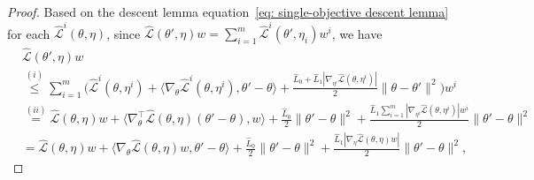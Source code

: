 \documentclass[twoside]{article} %
\def\eqref#1{equation~\ref{#1}}
\theoremstyle{plain}
\theoremstyle{definition}
\theoremstyle{remark}
\newcommand{\hL}{\hat{L}}
\newcommand{\fL}{\mathcal{L}}
\newcommand{\fhL}{\hat{\mathcal{L}}}
\begin{document}
\begin{proof}
Based on the descent lemma \eqref{eq: single-objective descent lemma} for each $\fhL^i(\theta, \eta)$, since $\fhL({\theta}', {\eta}){w} = \sum_{i=1}^{m} \fhL^i({\theta}',{\eta}_i)w^i$, we have
\begin{align}
    &\fhL({\theta}', {\eta}){w} \nonumber\\
    &\overset{(i)}{\leq} \sum_{i=1}^{m}\Big( {\fhL}^i({\theta}, \eta^i)+\langle\nabla_{{\theta}} {\fhL}^i({\theta}, \eta^i), {\theta}'-{\theta}\rangle+\frac{\hL_0+\hL_1|\nabla_{\eta^i} {\fhL}({\theta}, \eta^i)|}{2}\|{\theta}-{\theta}'\|^2\Big)w^i \nonumber\\
    & \overset{(ii)}{=} \fhL({\theta}, {\eta}){w}+ \langle  \nabla_{\theta}^{\top}\fhL(\theta,\eta)(\theta'-\theta), w \rangle + \frac{\hL_0}{2}\|{\theta}'-{\theta} \|^2+ \frac{\hL_1\sum_{i=1}^{m} | \nabla_{\eta^i} \fhL({\theta}, {\eta}^i)| w^i}{2}\|{\theta}'-{\theta} \|^2 \nonumber\\
    &= \fhL({\theta}, {\eta}){w} + \langle \nabla_{\theta}\fhL({\theta}, {\eta})w,{\theta}'-{\theta} \rangle + \frac{\hL_0}{2}\|{\theta}'-{\theta} \|^2+ \frac{\hL_1 | \nabla_{\eta} \fhL({\theta}, {\eta})w| }{2}\|{\theta}'-{\theta} \|^2,  \nonumber

\end{align}
\end{proof}
\end{document}

